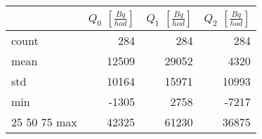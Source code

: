 \begin{tabular}{lrrr}
\toprule
{} &  $Q_0$ $\left[\si{\frac{Bq}{hod}}\right]$ &  $Q_1$ $\left[\si{\frac{Bq}{hod}}\right]$ &  $Q_2$ $\left[\si{\frac{Bq}{hod}}\right]$ \\
\midrule
count &                                       284 &                                       284 &                                       284 \\
mean  &                                     12509 &                                     29052 &                                      4320 \\
std   &                                     10164 &                                     15971 &                                     10993 \\
min   &                                     -1305 &                                      2758 &                                     -7217 \\
25%
50%
75%
max   &                                     42325 &                                     61230 &                                     36875 \\
\bottomrule
\end{tabular}
